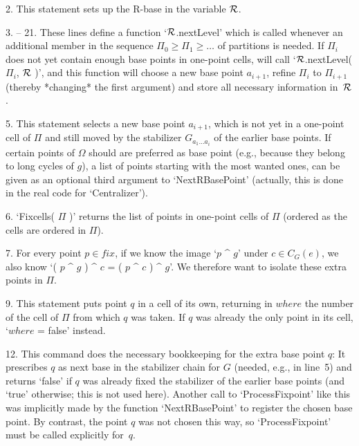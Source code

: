 \item{2.}
This statement sets up the R-base in the variable ${\cal R}$.

\item{3.} -- 21.
\enspace These lines define a function `${\cal R}$.nextLevel' which  is  called
whenever an additional member in the sequence $\Pi_0 \ge \Pi_1 \ge\ldots$
of partitions is needed. If $\Pi_i$ does  not  yet  contain  enough  base
points in one-point cells, {\GAP}  will  call  `${\cal R}$.nextLevel(  $\Pi_i$,
${\cal R}$ )', and this function will choose a new base point $a_{i+1}$, refine
$\Pi_i$ to $\Pi_{i+1}$ (thereby *changing* the first argument) and  store
all necessary information in~${\cal R}$.

\endlist
\beginlist%

\item{5.}
This statement selects a new base point $a_{i+1}$, which is not yet in  a
one-point cell of $\Pi$ and still moved by the  stabilizer  $G_{a_1\ldots
a_i}$ of the earlier base points. If certain points  of  $\Omega$  should
are preferred as base point (e.g., because they belong to long cycles  of
$g$), a list of points starting with the most wanted ones, can  be  given
as an optional third argument to `NextRBasePoint' (actually, this is done
in the real code for `Centralizer').

\item{6.}
`Fixcells( $\Pi$ )' returns the list of  points  in  one-point  cells  of
$\Pi$ (ordered as the cells are ordered in $\Pi$).

\item{7.}
For every point $p\in fix$, if we know the image `$p$ ^ $g$' under  $c\in
C_G(e)$, we also know `( $p$ ^ $g$ ) ^ $c$ = ( $p$ ^ $c$  )  ^  $g$'.  We
therefore want to isolate these extra points in $\Pi$.

\endlist
\beginlist%

\item{9.}
This statement puts point $q$ in a cell of its own, returning in  $where$
the number of the cell of $\Pi$ from which $q$  was  taken.  If  $q$  was
already the only point in its cell, `$where$ = false' instead.

\endlist
\beginlist%

\item{12.}
This command does the necessary bookkeeping for the extra base point $q$:
It prescribes $q$ as next base in the stabilizer chain for  $G$  (needed,
e.g., in line~5) and  returns  `false'  if  $q$  was  already  fixed  the
stabilizer of the earlier base points (and `true' otherwise; this is  not
used here). Another call to `ProcessFixpoint' like  this  was  implicitly
made by the function `NextRBasePoint' to register the chosen base  point.
By contrast, the point $q$ was not chosen this way, so  `ProcessFixpoint'
must be called explicitly for~$q$.

